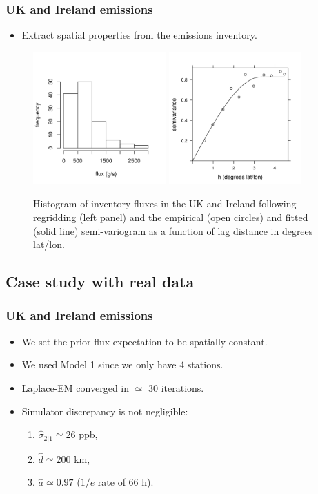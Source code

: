 \documentclass{beamer}
\begin{document}
\begin{frame}
\frametitle{UK and Ireland emissions}
\begin{itemize}
\item Extract spatial properties from the emissions inventory.
\end{itemize}
\begin{center}
\vspace{-0.5cm}

\begin{figure}
\includegraphics[width=2.0in]{histUK.png}
\includegraphics[width=2.0in]{variogram_est.png}
	\caption{Histogram of inventory fluxes in the UK and Ireland following regridding (left panel) and the empirical (open circles) and fitted (solid line) semi-variogram as a function of lag distance in degrees lat/lon. } \label{fig:var_est}
\end{figure}
\end{center}
\end{frame}

\subsection{Case study with real data}

\begin{frame}
\frametitle{UK and Ireland emissions}
\begin{itemize}
\item We set the prior-flux expectation to be spatially constant. \vfill
\item We used Model 1 since we only have 4 stations. \vfill
\item Laplace-EM converged in $\simeq$ 30 iterations. \vfill
\item Simulator discrepancy is not negligible: \vfill
\begin{enumerate}
\item $\hat\sigma_{2|1} \simeq 26$ ppb, \vfill
\item $\hat d \simeq 200$ km, \vfill
\item $\hat a \simeq 0.97$ ($1/e$ rate of 66 h). \vfill
\end{enumerate}
\end{itemize}
\end{frame}
\end{document}
